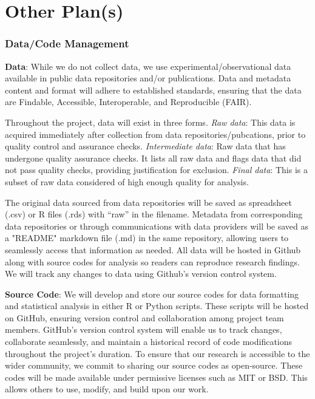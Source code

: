 \documentclass[12pt, class=article, crop=false]{standalone}
\begin{document}
\section*{Other Plan(s)}

\subsubsection*{Data/Code Management}

\textbf{Data}: While we do not collect data, we use experimental/observational data available in public data repositories and/or publications.
Data and metadata content and format will adhere to established standards, ensuring that the data are Findable, Accessible, Interoperable, and Reproducible (FAIR).

Throughout the project, data will exist in three forms.
\textit{Raw data}: This data is acquired immediately after collection from data repositories/pubcations, prior to quality control and assurance checks.
\textit{Intermediate data}: Raw data that has undergone quality assurance checks.
It lists all raw data and flags data that did not pass quality checks, providing justification for exclusion.
\textit{Final data}: This is a subset of raw data considered of high enough quality for analysis.

The original data sourced from data repositories will be saved as spreadsheet (.csv) or R files (.rds) with ``raw'' in the filename.
Metadata from corresponding data repositories or through communications with data providers will be saved as a "README" markdown file (.md) in the same repository, allowing users to seamlessly access that information as needed.
All data will be hosted in Github along with source codes for analysis so readers can reproduce research findings.
We will track any changes to data using Github's version control system.

\textbf{Source Code}: We will develop and store our source codes for data formatting and statistical analysis in either R or Python scripts.
These scripts will be hosted on GitHub, ensuring version control and collaboration among project team members. 
GitHub's version control system will enable us to track changes, collaborate seamlessly, and maintain a historical record of code modifications throughout the project's duration.
To ensure that our research is accessible to the wider community, we commit to sharing our source codes as open-source. These codes will be made available under permissive licenses such as MIT or BSD. This allows others to use, modify, and build upon our work.
\end{document}
